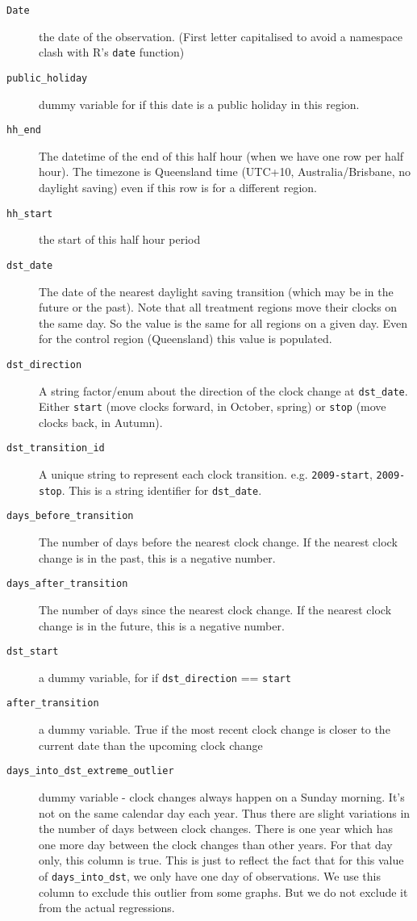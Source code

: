 \begin{description}
    \item[\texttt{Date}] the date of the observation. (First letter capitalised to avoid a namespace clash with R's \texttt{date} function)
    \item[\texttt{public\_holiday}] dummy variable for if this date is a public holiday in this region. 
    \item[\texttt{hh\_end}] The datetime of the end of this half hour (when we have one row per half hour). The timezone is Queensland time (UTC+10, Australia/Brisbane, no daylight saving) even if this row is for a different region.
    \item[\texttt{hh\_start}] the start of this half hour period
    \item[\texttt{dst\_date}] The date of the nearest daylight saving transition (which may be in the future or the past). Note that all treatment regions move their clocks on the same day. So the value is the same for all regions on a given day. Even for the control region (Queensland) this value is populated.
    \item[\texttt{dst\_direction}] A string factor/enum about the direction of the clock change at \texttt{dst\_date}. Either \texttt{start} (move clocks forward, in October, spring) or \texttt{stop} (move clocks back, in Autumn).
    \item[\texttt{dst\_transition\_id}] A unique string to represent each clock transition. e.g. \texttt{2009-start}, \texttt{2009-stop}. This is a string identifier for \texttt{dst\_date}.
    \item[\texttt{days\_before\_transition}] The number of days before the nearest clock change. If the nearest clock change is in the past, this is a negative number.
    \item[\texttt{days\_after\_transition}] The number of days since the nearest clock change. If the nearest clock change is in the future, this is a negative number.
    \item[\texttt{dst\_start}] a dummy variable, for if \texttt{dst\_direction} == \texttt{start}
    \item[\texttt{after\_transition}] a dummy variable. True if the most recent clock change is closer to the current date than the upcoming clock change
    \item[\texttt{days\_into\_dst\_extreme\_outlier}] dummy variable - clock changes always happen on a Sunday morning. It's not on the same calendar day each year. Thus there are slight variations in the number of days between clock changes. There is one year which has one more day between the clock changes than other years. For that day only, this column is true. This is just to reflect the fact that for this value of \texttt{days\_into\_dst}, we only have one day of observations. We use this column to exclude this outlier from some graphs. But we do not exclude it from the actual regressions.

\end{description}
